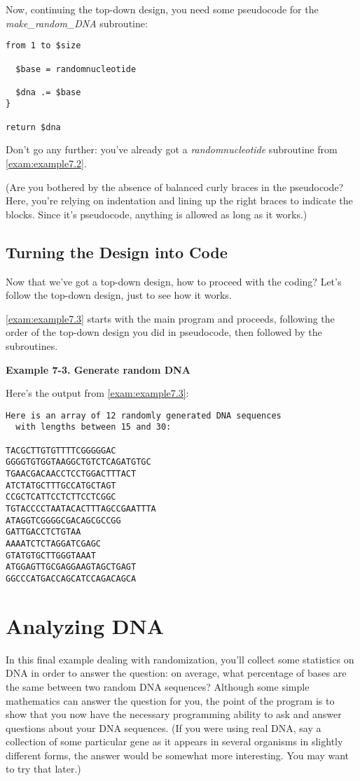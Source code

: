 Now, continuing the top-down design, you need some pseudocode for the \textit{make\_random\_DNA} subroutine:

\begin{lstlisting}
from 1 to $size

  $base = randomnucleotide

  $dna .= $base
}

return $dna
\end{lstlisting}

Don't go any further: you've already got a \textit{randomnucleotide} subroutine from \autoref{exam:example7.2}.

(Are you bothered by the absence of balanced curly braces in the pseudocode? Here, you're relying on indentation and lining up the right braces to indicate the blocks. Since it's pseudocode, anything is allowed as long as it works.) 

\subsection{Turning the Design into Code}
Now that we've got a top-down design, how to proceed with the coding? Let's follow the top-down design, just to see how it works.

\autoref{exam:example7.3} starts with the main program and proceeds, following the order of the top-down design you did in pseudocode, then followed by the subroutines. 

\textbf{Example 7-3. Generate random DNA}


Here's the output from \autoref{exam:example7.3}:

\begin{lstlisting}
Here is an array of 12 randomly generated DNA sequences
  with lengths between 15 and 30:

TACGCTTGTGTTTTCGGGGGAC
GGGGTGTGGTAAGGCTGTCTCAGATGTGC
TGAACGACAACCTCCTGGACTTTACT
ATCTATGCTTTGCCATGCTAGT
CCGCTCATTCCTCTTCCTCGGC
TGTACCCCTAATACACTTTAGCCGAATTTA
ATAGGTCGGGGCGACAGCGCCGG
GATTGACCTCTGTAA
AAAATCTCTAGGATCGAGC
GTATGTGCTTGGGTAAAT
ATGGAGTTGCGAGGAAGTAGCTGAGT
GGCCCATGACCAGCATCCAGACAGCA
\end{lstlisting}

\section{Analyzing DNA}
In this final example dealing with randomization, you'll collect some statistics on DNA in order to answer the question: on average, what percentage of bases are the same between two random DNA sequences? Although some simple mathematics can answer the question for you, the point of the program is to show that you now have the necessary programming ability to ask and answer questions about your DNA sequences. (If you were using real DNA, say a collection of some particular gene as it appears in several organisms in slightly different forms, the answer would be somewhat more interesting. You may want to try that later.)

